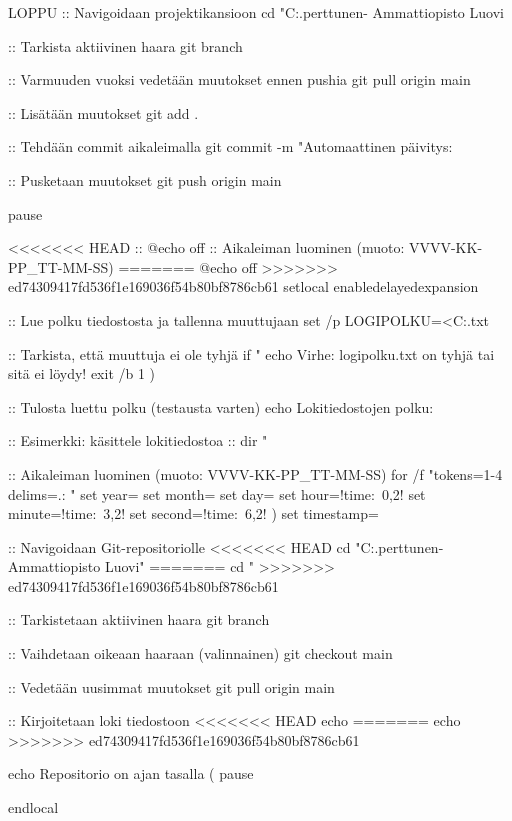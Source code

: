 

LOPPU
:: Navigoidaan projektikansioon
cd "C:\Users\antti.perttunen\OneDrive - Ammattiopisto Luovi\Tiedostot\Koodaus\Python

:: Tarkista aktiivinen haara
git branch

:: Varmuuden vuoksi vedetään muutokset ennen pushia
git pull origin main

:: Lisätään muutokset
git add .

:: Tehdään commit aikaleimalla
git commit -m "Automaattinen päivitys: %

:: Pusketaan muutokset
git push origin main

pause


<<<<<<< HEAD
:: @echo off
:: Aikaleiman luominen (muoto: VVVV-KK-PP_TT-MM-SS)
=======
@echo off
>>>>>>> ed74309417fd536f1e169036f54b80bf8786cb61
setlocal enabledelayedexpansion

:: Lue polku tiedostosta ja tallenna muuttujaan
set /p LOGIPOLKU=<C:\polku.txt

:: Tarkista, että muuttuja ei ole tyhjä
if "%
    echo Virhe: logipolku.txt on tyhjä tai sitä ei löydy!
    exit /b 1
)

:: Tulosta luettu polku (testausta varten)
echo Lokitiedostojen polku: %

:: Esimerkki: käsittele lokitiedostoa
:: dir "%

:: Aikaleiman luominen (muoto: VVVV-KK-PP_TT-MM-SS)
for /f "tokens=1-4 delims=.: " %
    set year=%
    set month=%
    set day=%
    set hour=!time:~0,2!
    set minute=!time:~3,2!
    set second=!time:~6,2!
)
set timestamp=%

:: Navigoidaan Git-repositoriolle
<<<<<<< HEAD
cd "C:\Users\antti.perttunen\OneDrive - Ammattiopisto Luovi\Tiedostot\Koodaus\Python"
=======
cd "%
>>>>>>> ed74309417fd536f1e169036f54b80bf8786cb61

:: Tarkistetaan aktiivinen haara
git branch

:: Vaihdetaan oikeaan haaraan (valinnainen)
git checkout main

:: Vedetään uusimmat muutokset
git pull origin main

:: Kirjoitetaan loki tiedostoon
<<<<<<< HEAD
echo %
=======
echo %
>>>>>>> ed74309417fd536f1e169036f54b80bf8786cb61

echo Repositorio on ajan tasalla (%
pause

endlocal